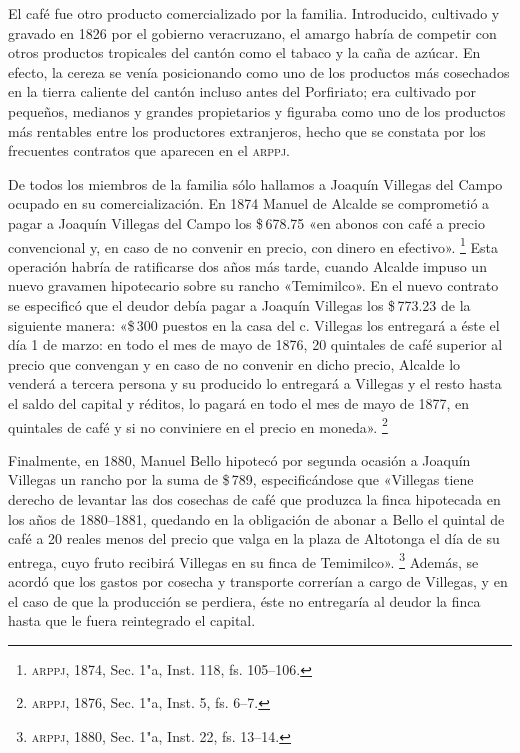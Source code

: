 \documentclass[14pt,twoside,final]{extbook} %
\let\oldfootnote\footnote
\renewcommand\footnote[1]{%
\oldfootnote{\hspace{1mm}#1}}
\begin{document}
El café fue otro producto comercializado por la familia. Introducido, cultivado y gravado en 1826 por el gobierno veracruzano, el amargo habría de competir con otros productos tropicales del cantón como el tabaco y la caña de azúcar. En efecto, la cereza se venía posicionando como uno de los productos más cosechados en la tierra caliente del cantón incluso antes del Porfiriato; era cultivado por pequeños, medianos y grandes propietarios y figuraba como uno de los productos más rentables entre los productores extranjeros, hecho que se constata por los frecuentes contratos que aparecen en el \textsc{arppj}.

De todos los miembros de la familia sólo hallamos a Joaquín Villegas del Campo ocupado en su comercialización. En 1874 Manuel de Alcalde se comprometió a pagar a Joaquín Villegas del Campo los \$\,678.75 «en abonos con café a precio convencional y, en caso de no convenir en precio, con dinero en efectivo».\footnote{\textsc{arppj}, 1874, Sec. 1"a, Inst. 118, fs. 105--106.} Esta operación habría de ratificarse dos años más tarde, cuando Alcalde impuso un nuevo gravamen hipotecario sobre su rancho «Temimilco». En el nuevo contrato se especificó que el deudor debía pagar a Joaquín Villegas los \$\,773.23 de la siguiente manera: «\$\,300 puestos en la casa del c. Villegas los entregará a éste el día 1 de marzo: en todo el mes de mayo de 1876, 20 quintales de café superior al precio que convengan y en caso de no convenir en dicho precio, Alcalde lo venderá a tercera persona y su producido lo entregará a Villegas y el resto hasta el saldo del capital y réditos, lo pagará en todo el mes de mayo de 1877, en quintales de café y si no conviniere en el precio en moneda».\footnote{\textsc{arppj}, 1876, Sec. 1"a, Inst. 5, fs. 6--7.}

Finalmente, en 1880, Manuel Bello hipotecó por segunda ocasión a Joaquín Villegas un rancho por la suma de \$\,789, especificándose que «Villegas tiene derecho de levantar las dos cosechas de café que produzca la finca hipotecada en los años de 1880--1881, quedando en la obligación de abonar a Bello el quintal de café a 20 reales menos del precio que valga en la plaza de Altotonga el día de su entrega, cuyo fruto recibirá Villegas en su finca de Temimilco».\footnote{\textsc{arppj}, 1880, Sec. 1"a, Inst. 22, fs. 13--14.} Además, se acordó que los gastos por cosecha y transporte correrían a cargo de Villegas, y en el caso de que la producción se perdiera, éste no entregaría al deudor la finca hasta que le fuera reintegrado el capital.
\end{document}
